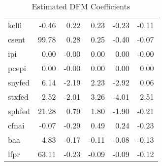 \documentclass[11pt, letterpaper]{article}\usepackage[]{graphicx}\usepackage[]{color}
\begin{document}
\begin{table}[H]
\begin{tabular}{lrrrrr}
  kclfi & -0.46 & 0.22 & 0.23 & -0.23 & -0.11 \\ 
  csent & 99.78 & 0.28 & 0.25 & -0.40 & -0.07 \\ 
  ipi & 0.00 & -0.00 & 0.00 & 0.00 & -0.00 \\ 
  pcepi & 0.00 & -0.00 & 0.00 & 0.00 & 0.00 \\ 
  snyfed & 6.14 & -2.19 & 2.23 & -2.92 & 0.06 \\ 
  stxfed & 2.52 & -2.01 & 3.26 & -4.01 & 2.51 \\ 
  sphfed & 21.28 & 0.79 & 1.80 & -1.90 & -0.21 \\ 
  cfnai & -0.07 & -0.29 & 0.49 & 0.24 & -0.23 \\ 
  baa & 4.83 & -0.17 & -0.11 & -0.08 & -0.13 \\ 
  lfpr & 63.11 & -0.23 & -0.09 & -0.09 & -0.12 \\ 
   \hline
\end{tabular}
\endgroup
\caption{Estimated DFM Coefficients} 
\end{table}
\end{document}
